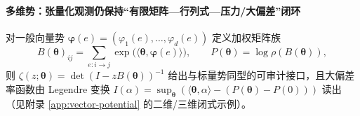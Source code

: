 \paragraph{多维势：张量化观测仍保持“有限矩阵—行列式—压力/大偏差”闭环}
对一般向量势
\(
\boldsymbol{\varphi}(e)=(\varphi_1(e),\dots,\varphi_d(e))
\)
定义加权矩阵族
\[
B(\boldsymbol{\theta})_{ij}=\sum_{e:i\to j}\exp\!\bigl(\langle\boldsymbol{\theta},\boldsymbol{\varphi}(e)\rangle\bigr),
\qquad
P(\boldsymbol{\theta})=\log\rho(B(\boldsymbol{\theta})),
\]
则
\(
\zeta(z;\boldsymbol{\theta})=\det(I-zB(\boldsymbol{\theta}))^{-1}
\)
给出与标量势同型的可审计接口，且大偏差率函数由 Legendre 变换
\(
I(\alpha)=\sup_{\boldsymbol{\theta}}(\langle\boldsymbol{\theta},\alpha\rangle-(P(\boldsymbol{\theta})-P(0)))
\)
读出（见附录 \ref{app:vector-potential} 的二维/三维闭式示例）。

